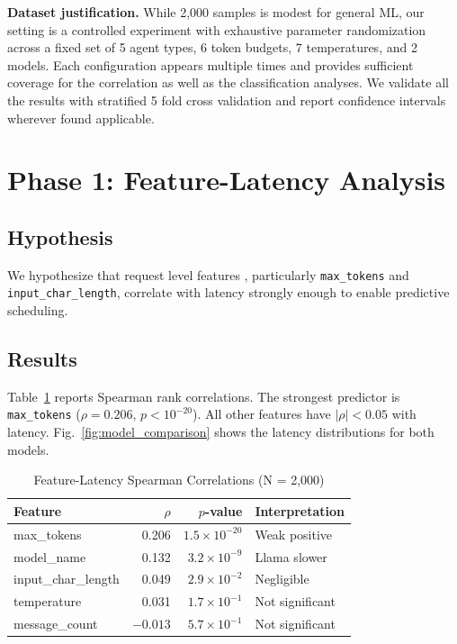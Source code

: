 \documentclass[conference]{IEEEtran}
\begin{document}
\textbf{Dataset justification.} While 2,000 samples is modest for general ML, our setting is a controlled experiment with exhaustive parameter randomization across a fixed set of 5 agent types, 6 token budgets, 7 temperatures, and 2 models. Each configuration appears multiple times  and provides sufficient coverage for the correlation as well as the  classification analyses. We validate all the results with stratified 5 fold cross validation and report confidence intervals wherever found applicable.

\section{Phase 1: Feature-Latency Analysis}

\subsection{Hypothesis}
We hypothesize that request level features , particularly \texttt{max\_tokens} and \texttt{input\_char\_length}, correlate with latency strongly enough to enable predictive scheduling.

\subsection{Results}
Table~\ref{tab:correlations} reports Spearman rank correlations. The strongest predictor is \texttt{max\_tokens} ($\rho = 0.206$, $p < 10^{-20}$). All other features have $|\rho| < 0.05$ with latency. Fig.~\ref{fig:model_comparison} shows the latency distributions for both models.

\begin{table}[htbp]
\caption{Feature-Latency Spearman Correlations (N = 2,000)}
\begin{center}
\begin{tabular}{lrrl}
\toprule
\textbf{Feature} & \textbf{$\rho$} & \textbf{$p$-value} & \textbf{Interpretation} \\
\midrule
max\_tokens & 0.206 & $1.5 \times 10^{-20}$ & Weak positive \\
model\_name & 0.132 & $3.2 \times 10^{-9}$ & Llama slower \\
input\_char\_length & 0.049 & $2.9 \times 10^{-2}$ & Negligible \\
temperature & 0.031 & $1.7 \times 10^{-1}$ & Not significant \\
message\_count & $-0.013$ & $5.7 \times 10^{-1}$ & Not significant \\
\bottomrule
\end{tabular}
\label{tab:correlations}
\end{center}
\end{table}
\end{document}
